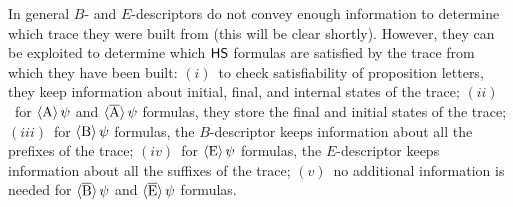 In general $B$- and $E$-descriptors do not convey enough information to determine which trace they were built from (this will be clear shortly). However, they can be exploited to determine which $\text{\sffamily HS}$ formulas are satisfied by the trace from which they have been built:
    $(i)$~to check satisfiability of proposition letters, they keep information about initial, final, and internal states of the trace;
    $(ii)$~for $\operatorname{\langle A\rangle}\psi$ and $\operatorname{\langle \overline{A}\rangle}\psi$ formulas, they store the final and initial states of the trace;
    $(iii)$~for $\operatorname{\langle B\rangle}\psi$ formulas, the $B$-descriptor keeps information about all the prefixes of the trace; 
    $(iv)$~for $\operatorname{\langle E\rangle}\psi$ formulas, the $E$-descriptor keeps information about all the suffixes of the trace;
    $(v)$~no additional information is needed for $\operatorname{\langle \overline{B}\rangle}\psi$ and $\operatorname{\langle \overline{E}\rangle}\psi$ formulas.

